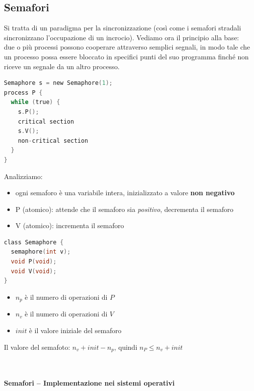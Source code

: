 \documentclass[a4paper,12pt]{article}
\begin{document}
\subsection{Semafori}
Si tratta di un paradigma per la sincronizzazione (così come i semafori stradali sincronizzano l'occupazione di un incrocio). Vediamo ora il principio alla base: due o più processi possono cooperare attraverso semplici segnali, in modo tale che un processo possa essere bloccato in specifici punti del suo programma finché non riceve un segnale da un altro processo.
\begin{lstlisting}[language=C]
Semaphore s = new Semaphore(1);
process P {
  while (true) {
    s.P();
    critical section
    s.V();
    non-critical section
  }
}
\end{lstlisting}
Analizziamo:
\begin{itemize}
  \item ogni semaforo è una variabile intera, inizializzato a valore \textbf{non negativo}
  \item P (atomico): attende che il semaforo sia \textit{positivo}, decrementa il semaforo
  \item V (atomico): incrementa il semaforo
\end{itemize}
\begin{minipage}{0.48\textwidth}
\begin{lstlisting}[language=C]
class Semaphore {
  semaphore(int v);
  void P(void);
  void V(void);
}
\end{lstlisting}
\end{minipage}
\begin{minipage}{0.48\textwidth}
\begin{itemize}
  \item $n_p$ è il numero di operazioni di $P$
  \item $n_v$ è il numero di operazioni di $V$
  \item $init$ è il valore iniziale del semaforo
\end{itemize}
Il valore del semafoto: $n_v + init - n_p$, quindi $n_P  \leq n_v + init$
\end{minipage} \\
\vspace{3em} \\
\textbf{Semafori – Implementazione nei sistemi operativi\\}
\end{document}
